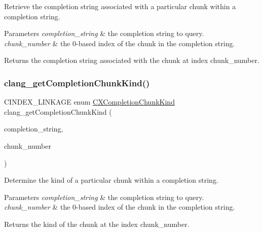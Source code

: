Retrieve the completion string associated with a particular chunk within a completion string. 


\begin{DoxyParams}{Parameters}
{\em completion\+\_\+string} & the completion string to query.\\
\hline
{\em chunk\+\_\+number} & the 0-\/based index of the chunk in the completion string.\\
\hline
\end{DoxyParams}
\begin{DoxyReturn}{Returns}
the completion string associated with the chunk at index {\ttfamily chunk\+\_\+number}. 
\end{DoxyReturn}
\mbox{\label{group__CINDEX__CODE__COMPLET_gac61e18c6d895d85f1476c6091d486091}} 
\subsubsection{\texorpdfstring{clang\+\_\+get\+Completion\+Chunk\+Kind()}{clang\_getCompletionChunkKind()}}
{\footnotesize\ttfamily C\+I\+N\+D\+E\+X\+\_\+\+L\+I\+N\+K\+A\+GE enum \mbox{\hyperlink{group__CINDEX__CODE__COMPLET_ga82570056548565efdd6fc74e57e75bbd}{C\+X\+Completion\+Chunk\+Kind}} clang\+\_\+get\+Completion\+Chunk\+Kind (\begin{DoxyParamCaption}\item[{\mbox{\hyperlink{group__CINDEX__CODE__COMPLET_gafea23a43a60ec3b4f3bedccfbb76883a}{C\+X\+Completion\+String}}}]{completion\+\_\+string,  }\item[{unsigned}]{chunk\+\_\+number }\end{DoxyParamCaption})}



Determine the kind of a particular chunk within a completion string. 


\begin{DoxyParams}{Parameters}
{\em completion\+\_\+string} & the completion string to query.\\
\hline
{\em chunk\+\_\+number} & the 0-\/based index of the chunk in the completion string.\\
\hline
\end{DoxyParams}
\begin{DoxyReturn}{Returns}
the kind of the chunk at the index {\ttfamily chunk\+\_\+number}. 
\end{DoxyReturn}
\mbox{\label{group__CINDEX__CODE__COMPLET_ga98d4c869dda8fd4b5386f62d02d6ba0b}} 
